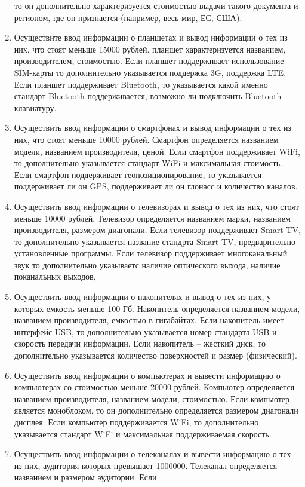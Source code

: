 \begin{enumerate}
то он дополнительно характеризуется стоимостью выдачи такого документа и регионом, где он
признается (например, весь мир, ЕС, США).
\item Осуществите ввод информации о планшетах и вывод информации о тех из них, что стоят меньше
15000 рублей. планшет характеризуется названием, производителем, стоимостью. Если планшет
поддерживает использование SIM-карты то дополнительно указывается поддержка 3G, поддержка LTE. Если планшет поддерживает Bluetooth, то указывается какой именно стандарт Bluetooth
поддерживается, возможно ли подключить Bluetooth клавиатуру.
\item Осуществить ввод информации о смартфонах и вывод информации о тех из них, что стоят меньше
10000 рублей. Смартфон определяется названием модели, названием производителя, ценой. Если
смартфон поддерживает WiFi, то дополнительно указывается стандарт WiFi и максимальная
стоимость. Если смартфон поддерживает геопозиционирование, то указывается поддерживает
ли он GPS, поддерживает ли он глонасс и количество каналов.
\item Осуществить ввод информации о телевизорах и вывод о тех из них, что стоят меньше 10000 рублей. Телевизор определяется названием марки, названием производителя, размером диагонали.
Если телевизор поддерживает Smart TV, то дополнительно указывается название стандрта Smart
TV, предварительно установленные программы. Если телевизор поддерживает многоканальный
звук то дополнительно указываетс наличие оптического выхода, наличие поканальных выходов,
\item Осуществить ввод информации о накопителях и вывод о тех из них, у которых емкость меньше 100 Гб. Накопитель определяется названием модели, названием производителя, емкостью в
гигабайтах. Если накопитель имеет интерфейс USB, то дополнительно указывается номер стандарта USB и скорость передачи информации. Если накопитель – жесткий диск, то дополнительно
указывается количество поверхностей и размер (физический).
\item Осуществить ввод информации о компьютерах и вывести информацию о компьютерах со стоимостью меньше 20000 рублей. Компьютер определяется названием производителя, названием
модели, стоимостью. Если компьютер является моноблоком, то он дополнительно определяется
размером диагонали дисплея. Если компьютер поддерживается WiFi, то дополнительно указывается стандарт WiFi и максимальная поддерживаемая скорость.
\item Осуществить ввод информации о телеканалах и вывести информацию о тех из них, аудитория
которых превышает 1000000. Телеканал определяется названием и размером аудитории. Если

\end{enumerate}
